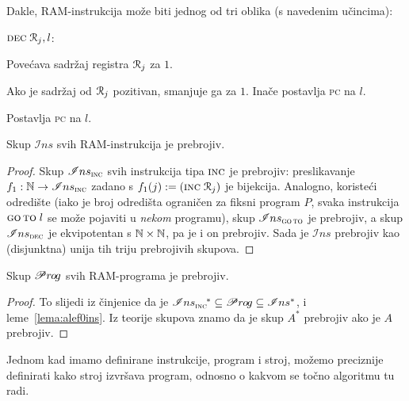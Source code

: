 Dakle, RAM-instrukcija može biti jednog od tri oblika (s navedenim učincima):
\begin{labeling}{$\decr{j}{l}$:}
    \item[$\incr{j}$:] Povećava sadržaj registra $\mathcal R_{j}$ za $1$.
    \item[$\decr{j}{l}$:] Ako je sadržaj od $\mathcal R_{j}$ pozitivan, smanjuje ga za $1$. Inače postavlja \textsc{pc} na $l$.
    \item[$\goto\;l$:] Postavlja \textsc{pc} na $l$.
\end{labeling}

\begin{lema}[{name=[prebrojivost skupa $\mathscr Ins$]}]\label{lema:alef0ins}
Skup $\mathscr Ins$ svih RAM-instrukcija je prebrojiv\!.
\end{lema}
\begin{proof}
Skup $\mathscr Ins_{\textsc{inc}}$ svih instrukcija tipa $\textsc{inc}$ je prebrojiv: preslikavanje $f_1:{\mathbb N}\to\mathscr Ins_{\textsc{inc}}$ zadano s $f_1(j):=(\textsc{inc}\;\mathcal R_{j})$ je bijekcija. Analogno, koristeći odredište (iako je broj odredišta ograničen za fiksni program $P$, svaka instrukcija $\goto\;l$ se može pojaviti u \emph{nekom} programu), skup $\mathscr Ins_{\textsc{go\,to}}$ je prebrojiv\!, a skup $\mathscr Ins_{\textsc{dec}}$ je ek\-vi\-po\-ten\-tan s ${\mathbb N}\times{\mathbb N}$, pa je i on prebrojiv\!. Sada je $\mathscr Ins$ prebrojiv kao (disjunktna) unija tih triju prebrojivih skupova.
\end{proof}

\begin{korolar}[{name=[prebrojivost skupa $\mathscr Pr\mspace{-1mu}o\mspace{-2mu}g$]}]\label{kor:alef0prog}
	Skup $\mathscr Pr\mspace{-1mu}o\mspace{-2mu}g$ svih RAM-programa je prebrojiv\!.
\end{korolar}
\begin{proof}
	To slijedi iz činjenice da je $\mathscr Ins_{\textsc{inc}}^{\quad*}\subseteq\mathscr Pr\mspace{-1mu}o\mspace{-2mu}g\subseteq\mathscr Ins^*$, i leme~\ref{lema:alef0ins}. Iz teorije skupova znamo da je skup $A^*$ prebrojiv ako je $A$ prebrojiv\!.
\end{proof}


Jednom kad imamo definirane instrukcije, program i stroj, možemo preciznije definirati kako stroj izvršava program, odnosno o kakvom se točno algoritmu tu radi.

